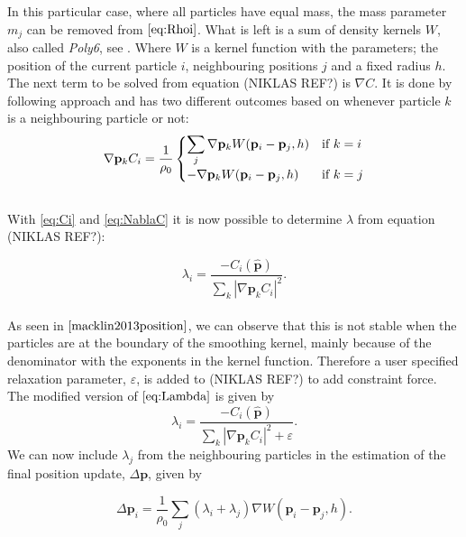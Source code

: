 In this particular case, where all particles have equal mass, the mass parameter $m_j$ can be removed from $\ref{eq:Rhoi}$. What is left is a sum of density kernels $W$, also called \textit{Poly6}, see \cite{macklin2013position}. Where $W$ is a kernel function with the parameters; the position of the current particle  $i$, neighbouring positions $j$ and a fixed radius $h$.
\\
The next term to be solved from equation (NIKLAS REF?) is $\nabla C$. It is done by following \cite{macklin2013position} approach and has two different outcomes based on whenever particle $k$ is a neighbouring particle or not:
\\
\begin{equation}
 \nabla \mathbf{p}_k C_i = \frac{1}{\rho_0}
  \begin{cases}
  \label{eq:NablaC}
   \displaystyle \sum\limits_{j} \nabla \mathbf{p}_k W(\mathbf{p}_i - \mathbf{p}_j, h) & $\text{if }$ k = i \\
   - \nabla \mathbf{p}_k W(\mathbf{p}_i - \mathbf{p}_j, h) & $\text{if }$ k = j \\
  \end{cases}
\end{equation}
\\
With \ref{eq:Ci} and \ref{eq:NablaC} it is now possible to determine $\lambda$ from equation (NIKLAS REF?):

\begin{equation}
\label{eq:Lambda}
\lambda_i = \frac{- C_i(\hat{\mathbf{p}}) }{ \sum\limits_{k} |\nabla \mathbf{p}_k C_i|^2 }.
\end{equation}
\\
As seen in $\cite{macklin2013position}$, we can observe that this is not stable when the particles are at the boundary of the smoothing kernel, mainly because of the denominator with the exponents in the kernel function. Therefore a user specified relaxation parameter, $\varepsilon$, is added to (NIKLAS REF?) to add constraint force. The modified version of $\ref{eq:Lambda}$ is given by
\begin{equation}
\label{eq:LambdaEpsilon}
\lambda_i = \frac{- C_i(\hat{\mathbf{p}}) }{ \sum\limits_{k} |\nabla \mathbf{p}_k C_i|^2 + \varepsilon}.
\end{equation}
We can now include $\lambda_j$ from the neighbouring particles in the estimation of the final position update, $\Delta \mathbf{p}$, given by

\begin{equation}
\label{eq:DeltaP}
\Delta \mathbf{p}_i = \frac{1}{\rho_0} \sum\limits_{j} (\lambda_i + \lambda_j) \nabla W(\mathbf{p}_i - \mathbf{p}_j, h).
\end{equation}

